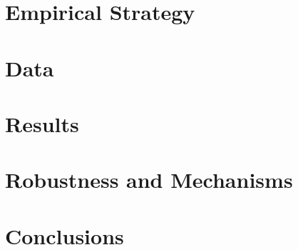 \section{Empirical Strategy}\label{sec:empirical_strategy}


\section{Data}\label{sec:data}

\section{Results}\label{sec:results}


















\section{Robustness and Mechanisms}\label{sec:robustness_mechanisms}



\section{Conclusions}\label{sec:conclusions}







